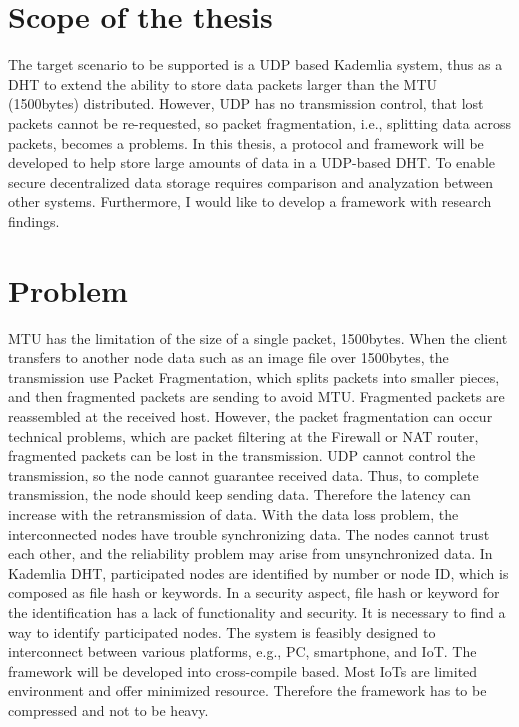 \documentclass{article}
\begin{document}
\section{Scope of the thesis }
The target scenario to be supported is a UDP based Kademlia system\cite{maymounkov2002kademlia}, thus as a DHT to extend the ability to store data packets larger than the MTU (1500bytes) distributed\cite{ietf-intarea-frag-fragile-17}. However, UDP has no transmission control, that lost packets cannot be re-requested, so packet fragmentation, i.e., splitting data across packets, becomes a problems\cite{rfc791}\cite{rfc815}. 
In this thesis, a protocol and framework will be developed to help store large amounts of data in a UDP-based DHT. To enable secure decentralized data storage requires comparison and analyzation between other systems. Furthermore, I would like to develop a framework with research findings. 

\section{Problem}
MTU has the limitation of the size of a single packet, 1500bytes. When the client transfers to another node data such as an image file over 1500bytes, the transmission use Packet Fragmentation, which splits packets into smaller pieces, and then fragmented packets are sending to avoid MTU. Fragmented packets are reassembled at the received host. However, the packet fragmentation can occur technical problems, which are packet filtering at the Firewall or NAT router, fragmented packets can be lost in the transmission. UDP cannot control the transmission, so the node cannot guarantee received data. Thus, to complete transmission, the node should keep sending data. Therefore the latency can increase with the retransmission of data. With the data loss problem, the interconnected nodes have trouble synchronizing data. The nodes cannot trust each other, and the reliability problem may arise from unsynchronized data.
In Kademlia DHT, participated nodes are identified by number or node ID, which is composed as file hash or keywords. In a security aspect, file hash or keyword for the identification has a lack of functionality and security. It is necessary to find a way to identify participated nodes.
The system is feasibly designed to interconnect between various platforms, e.g., PC, smartphone, and IoT. The framework will be developed into cross-compile based. Most IoTs are limited environment and offer minimized resource. Therefore the framework has to be compressed and not to be heavy.
\end{document}
